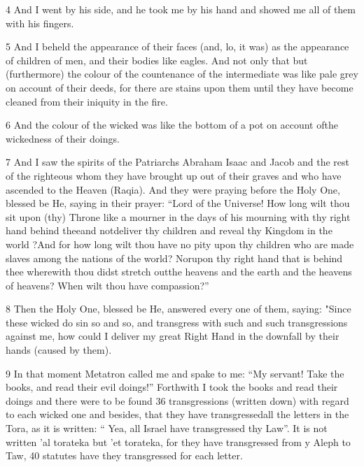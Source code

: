 \par 4 And I went by his side, and he took me by his hand and showed me all of them with his fingers. 

\par 5 And I beheld the appearance of their faces (and, lo, it was) as the appearance of children of men, and their bodies like eagles. And not only that but (furthermore) the colour of the countenance of the intermediate was like pale grey on account of their deeds, for there are stains upon them until they have become cleaned from their iniquity in the fire. 

\par 6 And the colour of the wicked was like the bottom of a pot on account ofthe wickedness of their doings. 

\par 7 And I saw the spirits of the Patriarchs Abraham Isaac and Jacob and the rest of the righteous whom they have brought up out of their graves and who have ascended to the Heaven (Raqia). And they were praying before the Holy One, blessed be He, saying in their prayer: “Lord of the Universe! How long wilt thou sit upon (thy) Throne like a mourner in the days of his mourning with thy right hand behind theeand notdeliver thy children and reveal thy Kingdom in the world ?And for how long wilt thou have no pity upon thy children who are made slaves among the nations of the world? Norupon thy right hand that is behind thee wherewith thou didst stretch outthe heavens and the earth and the heavens of heavens? When wilt thou have compassion?” 

\par 8 Then the Holy One, blessed be He, answered every one of them, saying: "Since these wicked do sin so and so, and transgress with such and such transgressions against me, how could I deliver my great Right Hand in the downfall by their hands (caused by them). 

\par 9 In that moment Metatron called me and spake to me: “My servant! Take the books, and read their evil doings!” Forthwith I took the books and read their doings and there were to be found 36 transgressions (written down) with regard to each wicked one and besides, that they have transgressedall the letters in the Tora, as it is written: “ Yea, all Israel have transgressed thy Law”. It is not written 'al torateka but 'et torateka, for they have transgressed from y Aleph to Taw, 40 statutes have they transgressed for each letter. 

